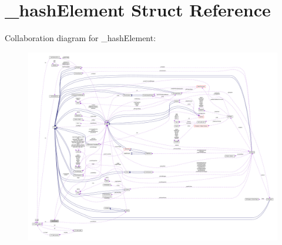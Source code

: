 \hypertarget{struct__hashElement}{}\section{\+\_\+hash\+Element Struct Reference}
\label{struct__hashElement}


Collaboration diagram for \+\_\+hash\+Element\+:
\nopagebreak
\begin{figure}[H]
\begin{center}
\leavevmode
\includegraphics[width=350pt]{struct__hashElement__coll__graph}
\end{center}
\end{figure}
